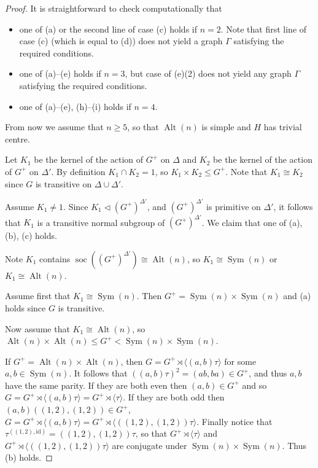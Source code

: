 \documentclass[11pt]{amsart}
\DeclareMathOperator{\Sym}{Sym}
\DeclareMathOperator{\Alt}{Alt}
\DeclareMathOperator{\soc}{soc}
\begin{document}
\begin{proof}
It is straightforward to check computationally that 
\begin{itemize}
\item one of (a) or the second line of case (c) holds if $n=2$. Note that first line of case (c) (which is equal to (d))  does not yield a graph $\Gamma$ satisfying the required conditions. 
   \item  one of (a)--(e) holds if $n=3$,  but  case of (e)(2)  does not yield any graph $\Gamma$ satisfying the required conditions.
   \item one of (a)--(e), (h)--(i) holds if $n=4$. 
\end{itemize}

From now we assume that $n\geq 5$, so that $\Alt(n)$ is simple and $H$ has trivial centre.

Let $K_1$ be the kernel of the action of $G^+$ on $\Delta$ and $K_2$ be the kernel of the action of $G^+$ on $\Delta'$. By definition $K_1\cap K_2=1$, so $K_1\times K_2\leqslant G^+.$ Note that $K_1\cong K_2$ since $G$ is transitive on  $\Delta\cup\Delta'$.

Assume $K_1\neq 1$. Since $K_1\lhd (G^+)^{\Delta'}$, and $(G^+)^{\Delta'}$ is primitive on $\Delta'$, it follows that $K_1$ is a transitive normal subgroup of $(G^+)^{\Delta'}$. %
We claim that one of (a), (b), (c) holds.

Note $K_1$ contains $\soc((G^+)^{\Delta'})\cong \Alt(n)$, so $K_1\cong \Sym(n)$ or $K_1\cong \Alt(n)$.

Assume first that $K_1\cong \Sym(n)$. Then $G^+=\Sym(n) \times \Sym(n)$ and (a) holds since $G$ is transitive.

Now assume that  $K_1\cong \Alt(n)$, so $\Alt(n) \times \Alt(n)\leqslant G^+<\Sym(n) \times \Sym(n)$.

If $G^+=\Alt(n) \times \Alt(n)$, then $G=G^+\rtimes \langle(a,b)\tau\rangle$ for some $a,b\in\Sym(n)$. It follows that $((a,b)\tau)^2=(ab,ba)\in G^+$, and thus $a,b$ have the same parity. If they are both even then $(a,b)\in G^+$ and so  $G=G^+\rtimes \langle(a,b)\tau\rangle=G^+\rtimes \langle \tau\rangle$. If they are both odd then $(a,b)((1,2),(1,2))\in G^+$, $G=G^+\rtimes \langle(a,b)\tau\rangle=G^+\rtimes \langle ((1,2),(1,2)) \tau\rangle$. Finally notice that $\tau^{((1,2),\mathrm{id})}=((1,2),(1,2)) \tau$, so that $G^+\rtimes \langle \tau\rangle$ and $G^+\rtimes \langle ((1,2),(1,2)) \tau\rangle$ are conjugate under $\Sym(n) \times \Sym(n)$. Thus (b) holds.


\end{proof}
\end{document}
